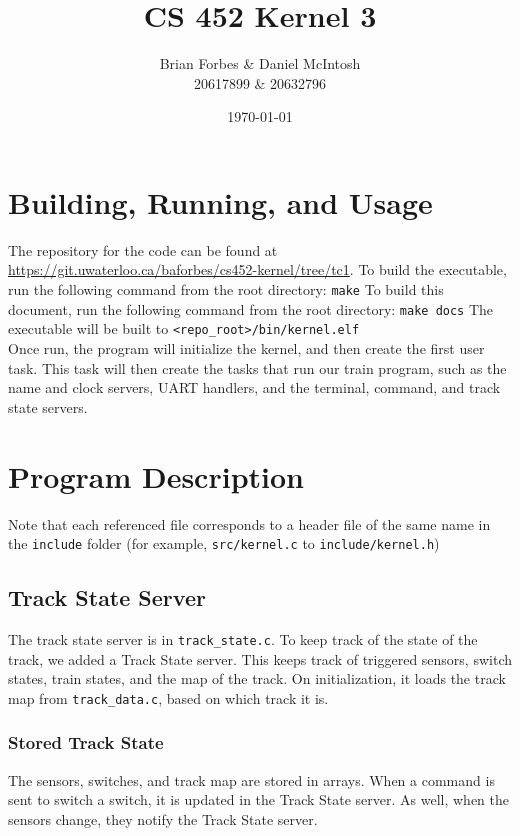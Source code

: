 \documentclass{article}
\begin{document}
\title{CS 452 Kernel 3}
\author{Brian Forbes \& Daniel McIntosh \\ 20617899 \& 20632796}
\date{\today}

\maketitle

\section{ Building, Running, and Usage }

The repository for the code can be found at \url{https://git.uwaterloo.ca/baforbes/cs452-kernel/tree/tc1}.
To build the executable, run the following command from the root directory: \verb|make|
To build this document, run the following command from the root directory: \verb|make docs|
The executable will be built to \verb|<repo_root>/bin/kernel.elf|\\

Once run, the program will initialize the kernel, and then create the first user task. This task will then create the tasks that run our train program, such as the name and clock servers, UART handlers, and the terminal, command, and track state servers.

\section{Program Description}
Note that each referenced file corresponds to a header file of the same name in the \verb|include| folder (for example, \verb|src/kernel.c| to \verb|include/kernel.h|)

\subsection{ Track State Server}
The track state server is in \verb|track_state.c|.
To keep track of the state of the track, we added a Track State server. This keeps track of triggered sensors, switch states, train states, and the map of the track. 
On initialization, it loads the track map from \verb|track_data.c|, based on which track it is.
\subsubsection{ Stored Track State }
The sensors, switches, and track map are stored in arrays. When a command is sent to switch a switch, it is updated in the Track State server. As well, when the sensors change, they notify the Track State server.
\end{document}
